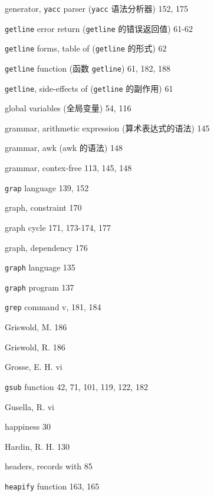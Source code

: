 \begin{multicols}{3}
\hangindent=3pc  generator, \verb'yacc' parser (\verb'yacc'
语法分析器) 152, 175

\hangindent=3pc  \verb'getline' error return (\verb'getline'
的错误返回值) 61-62

\hangindent=3pc  \verb'getline' forms, table of (\verb'getline'
的形式) 62

\hangindent=3pc  \verb'getline' function (函数 \verb'getline')
61, 182, 188

\hangindent=3pc  \verb'getline', side-effects of
(\verb'getline' 的副作用) 61

\hangindent=3pc  global variables (全局变量) 54, 116

\hangindent=3pc  grammar, arithmetic expression
(算术表达式的语法) 145

\hangindent=3pc  grammar, awk (awk 的语法) 148

\hangindent=3pc  grammar, contex-free 113, 145, 148

\hangindent=3pc  \verb'grap' language 139, 152

\hangindent=3pc  graph, constraint 170

\hangindent=3pc  graph cycle 171, 173-174, 177

\hangindent=3pc  graph, dependency 176

\hangindent=3pc  \verb'graph' language 135

\hangindent=3pc  \verb'graph' program 137

\hangindent=3pc  \verb'grep' command v, 181, 184

\hangindent=3pc  Griswold, M. 186

\hangindent=3pc  Griswold, R. 186

\hangindent=3pc  Grosse, E. H. vi

\hangindent=3pc  \verb'gsub' function 42, 71, 101, 119, 122, 182

\hangindent=3pc  Gusella, R. vi

\hangindent=3pc  happiness 30

\hangindent=3pc  Hardin, R. H. 130

\hangindent=3pc  headers, records with 85

\hangindent=3pc  \verb'heapify' function 163, 165


\end{multicols}
